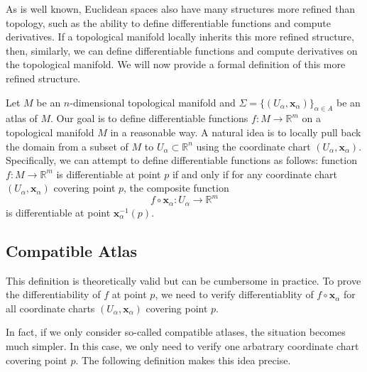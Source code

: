 \documentclass{report}
\begin{document}
As is well known, Euclidean spaces also have many structures more refined than topology, such as the ability to define differentiable functions and compute derivatives. If a topological manifold locally inherits this more refined structure, then, similarly, we can define differentiable functions and compute derivatives on the topological manifold. We will now provide a formal definition of this more refined structure.

Let $M$ be an $n$-dimensional topological manifold and $\Sigma=\{(U_\alpha,\mathbf{x}_\alpha)\}_{\alpha\in
A}$ be an atlas of $M$. Our goal is to define differentiable functions $f:M\to \mathbb{R}^m$ on a topological manifold $M$ in a reasonable way. A natural idea is to locally pull back the domain from a subset of $M$ to $U_\alpha\subset\mathbb{R}^n$ using the coordinate chart $(U_\alpha,\mathbf{x}_\alpha)$. Specifically, we can attempt to define differentiable functions as follows: function $f:M\to \mathbb{R}^m$ is differentiable at point $p$ if and only if for any coordinate chart $(U_\alpha,\mathbf{x}_\alpha)$ covering point $p$, the composite function
\[
    f\circ \mathbf{x}_\alpha:U_\alpha\longrightarrow \mathbb{R}^m
\]
is differentiable at point $\mathbf{x}^{-1}_\alpha(p)$.

\subsection{Compatible Atlas}
This definition is theoretically valid but can be cumbersome in practice. To prove the differentiability of $f$ at point $p$, we need to verify differentiablity of $f\circ \mathbf{x}_\alpha$ for all coordinate charts $(U_\alpha,\mathbf{x}_\alpha)$ covering point $p$. 

In fact, if we only consider so-called compatible atlases, the situation becomes much simpler. In this case, we only need to verify one arbatrary 
coordinate chart covering point $p$. The following definition makes this idea precise.

\end{document}

